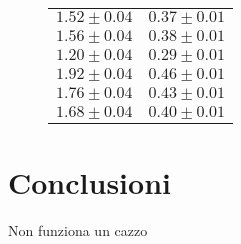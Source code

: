 \documentclass{article}
\begin{document}
\begin{figure}[h]
\begin{multicols}{2}
\begin{center}
\begin{tabular}{c|c}
$1.52 \pm 0.04 $&$0.37 \pm 0.01$\\

$1.56 \pm 0.04 $&$0.38 \pm 0.01$\\

$1.20 \pm 0.04 $&$0.29 \pm 0.01$\\

$1.92 \pm 0.04 $&$0.46 \pm 0.01$\\

$1.76 \pm 0.04 $&$0.43 \pm 0.01$\\

$1.68 \pm 0.04 $&$0.40 \pm 0.01$\\

\end{tabular}
\end{center} 
\end{multicols}
\end{figure}

\section{Conclusioni}
\lipsum[1-2]
Non funziona un cazzo
\end{document}
